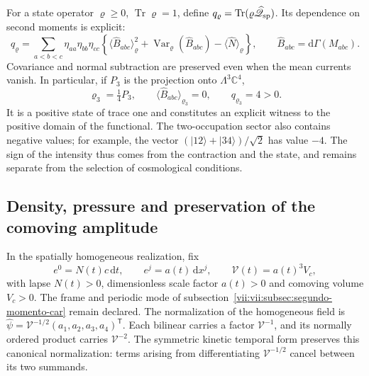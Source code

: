 For a state operator \(\varrho\geq0\),
\(\operatorname{Tr}\varrho=1\), define
\(q_\varrho=\operatorname{Tr}(\varrho\widehat{\mathscr Q}_{\rm sp})\).
Its dependence on second moments is explicit:
\begin{equation}
 q_\varrho=\sum_{a<b<c}\eta_{aa}\eta_{bb}\eta_{cc}
 \left\{
  \langle\widehat B_{abc}\rangle_\varrho^2
  +\operatorname{Var}_\varrho(\widehat B_{abc})
  -\langle\widehat N\rangle_\varrho
 \right\},\qquad
 \widehat B_{abc}=\mathrm d\Gamma(M_{abc}).
 \label{vii:vii:eq:covarianza-espin-material}
\end{equation}
Covariance and normal subtraction are preserved even when
the mean currents vanish. In particular, if \(P_3\) is the
projection onto \(\Lambda^3\mathbb C^4\),
\begin{equation}
 \varrho_3=\tfrac14P_3,\qquad
 \langle\widehat B_{abc}\rangle_{\varrho_3}=0,\qquad
 q_{\varrho_3}=4>0.
 \label{vii:vii:eq:testigo-positivo-espin}
\end{equation}
It is a positive state of trace one and constitutes an explicit witness
to the positive domain of the functional. The two-occupation sector
also contains negative values; for example, the vector
\((|12\rangle+|34\rangle)/\sqrt2\) has value \(-4\).
The sign of the intensity thus comes from the contraction and the
state, and remains separate from the selection of cosmological conditions.

\subsection{Density, pressure and preservation of the comoving amplitude}
\label{vii:vii:subsec:amplitud-espinorial-comovil}

In the spatially homogeneous realization, fix
\[
 e^0=N(t)c\,\mathrm dt,\qquad e^j=a(t)\,\mathrm dx^j,
 \qquad \mathcal V(t)=a(t)^3V_c,
\]
with lapse \(N(t)>0\), dimensionless scale factor \(a(t)>0\)
and comoving volume \(V_c>0\). The frame and periodic mode of
subsection~\ref{vii:vii:subsec:segundo-momento-car} remain declared.
The normalization of the homogeneous field is
\(\widehat\psi=\mathcal V^{-1/2}(a_1,a_2,a_3,a_4)^{\mathsf T}\).
Each bilinear carries a factor \(\mathcal V^{-1}\), and its normally
ordered product carries \(\mathcal V^{-2}\). The symmetric kinetic
temporal form preserves this canonical normalization: terms
arising from differentiating \(\mathcal V^{-1/2}\) cancel between
its two summands.

